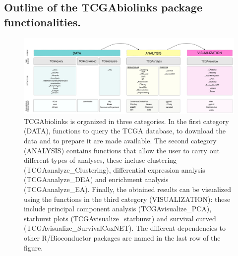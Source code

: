 


\subsection{Outline of the TCGAbiolinks package functionalities.}
\begin{figure}
\centering
\includegraphics[width=\textwidth]{images/workflow_draft2_noboxes.pdf}
\caption{TCGAbiolinks is organized in three categories. In the first category (DATA), functions to query the TCGA database, to download the data and to prepare it are made available. The second category (ANALYSIS) contains functions that allow the user to carry out different types of analyses, these incluse clustering (TCGAanalyze\_Clustering), differential expression analysis (TCGAanalyze\_DEA) and enrichment analysis (TCGAanalyze\_EA). Finally, the obtained results can be visualized using the functions in the third category (VISUALIZATION): these include principal component analysis (TCGAvisualize\_PCA), starburst plots (TCGAvisualize\_starburst) and survival curved (TCGAvisualize\_SurvivalCoxNET). The different dependencies to other R/Bioconductor packages are named in the last row of the figure.}
\label{fig:workflow}
\end{figure}

